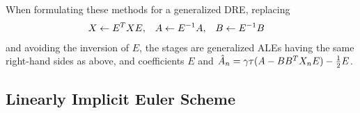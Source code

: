 \begin{remark}
  When formulating these methods for a generalized \ac{DRE},
  \ie replacing
  \begin{align*}
    X &\gets E^T X E, &
    A &\gets E^{-1} A, &
    B &\gets E^{-1} B
  \end{align*}
  and avoiding the inversion of $E$,
  the stages are generalized \acp{ALE}
  having the same right-hand sides as above,
  and coefficients $E$ and $\hat A_n = \gamma\tau(A - BB^T X_n E) - \frac{1}{2} E$.
\end{remark}

\pagebreak

\subsection{Linearly Implicit Euler Scheme}

